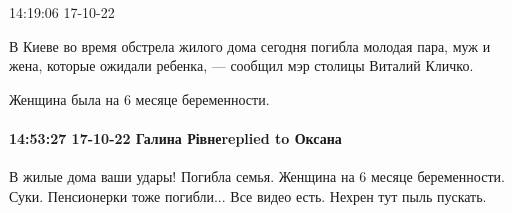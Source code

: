  
 
 
 
 

14:19:06 17-10-22

В Киеве во время обстрела жилого дома сегодня погибла молодая пара, муж и жена,
которые ожидали ребенка, — сообщил мэр столицы Виталий Кличко.

Женщина была на 6 месяце беременности.

\paragraph{14:53:27 17-10-22 Галина Рівнеreplied to Оксана}

В жилые дома ваши удары! Погибла семья. Женщина на 6 месяце беременности. Суки.
Пенсионерки тоже погибли... Все видео есть. Нехрен тут пыль пускать.
